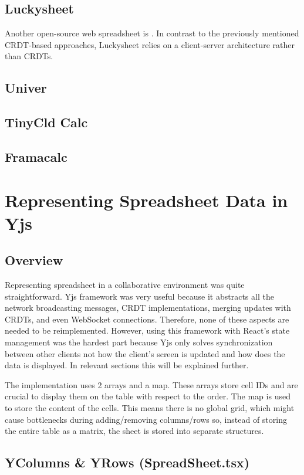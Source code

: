 \documentclass{article}
\begin{document}
\subsection{Luckysheet}

Another open-source web spreadsheet is \cite{luckysheet}.
In contrast to the previously mentioned CRDT-based approaches, Luckysheet relies on a
client-server architecture rather than CRDTs.

\subsection{Univer}

\subsection{TinyCld Calc}
\subsection{Framacalc}

\section{Representing Spreadsheet Data in Yjs}

\subsection{Overview}
Representing spreadsheet in a collaborative environment was quite straightforward. 
Yjs framework was very useful because it abstracts all the network broadcasting messages, 
CRDT implementations, merging updates with CRDTs, and even WebSocket connections. 
Therefore, none of these aspects are needed to be reimplemented. 
However, using this framework with React's state management was the hardest part 
because Yjs only solves synchronization between other clients not how the client's screen is updated 
and how does the data is displayed. 
In relevant sections this will be explained further.  

The implementation uses 2 arrays and a map. These arrays store cell IDs and are crucial to display them on the table with respect to the order. The map is used to store the content of the cells. This means there is no global grid, which might cause bottlenecks during adding/removing columns/rows so, instead of storing the entire table as a matrix, the sheet is stored into separate structures.

\subsection{YColumns \& YRows (SpreadSheet.tsx)}
\end{document}
